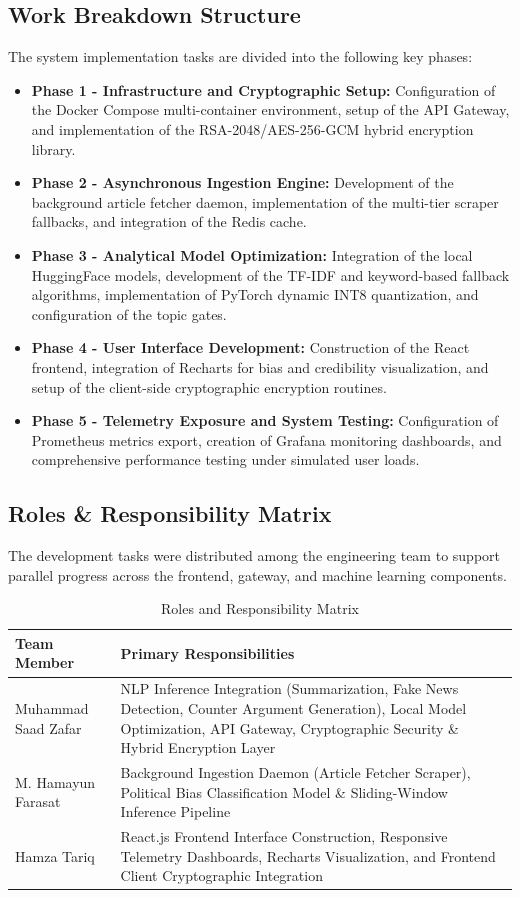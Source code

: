 \subsection{Work Breakdown Structure}
The system implementation tasks are divided into the following key phases:
\begin{itemize}
    \item \textbf{Phase 1 - Infrastructure and Cryptographic Setup:} Configuration of the Docker Compose multi-container environment, setup of the API Gateway, and implementation of the RSA-2048/AES-256-GCM hybrid encryption library.
    \item \textbf{Phase 2 - Asynchronous Ingestion Engine:} Development of the background article fetcher daemon, implementation of the multi-tier scraper fallbacks, and integration of the Redis cache.
    \item \textbf{Phase 3 - Analytical Model Optimization:} Integration of the local HuggingFace models, development of the TF-IDF and keyword-based fallback algorithms, implementation of PyTorch dynamic INT8 quantization, and configuration of the topic gates.
    \item \textbf{Phase 4 - User Interface Development:} Construction of the React frontend, integration of Recharts for bias and credibility visualization, and setup of the client-side cryptographic encryption routines.
    \item \textbf{Phase 5 - Telemetry Exposure and System Testing:} Configuration of Prometheus metrics export, creation of Grafana monitoring dashboards, and comprehensive performance testing under simulated user loads.
\end{itemize}

\subsection{Roles \& Responsibility Matrix}
The development tasks were distributed among the engineering team to support parallel progress across the frontend, gateway, and machine learning components.

\begin{table}[h]
\centering
\caption{Roles and Responsibility Matrix}
\label{tab:roles_matrix}
\renewcommand{\arraystretch}{1.2}
\begin{tabular}{|l|p{8.5cm}|}
\hline
\textbf{Team Member} & \textbf{Primary Responsibilities} \\ \hline
Muhammad Saad Zafar & NLP Inference Integration (Summarization, Fake News Detection, Counter Argument Generation), Local Model Optimization, API Gateway, Cryptographic Security \& Hybrid Encryption Layer \\ \hline
M. Hamayun Farasat & Background Ingestion Daemon (Article Fetcher Scraper), Political Bias Classification Model \& Sliding-Window Inference Pipeline \\ \hline
Hamza Tariq & React.js Frontend Interface Construction, Responsive Telemetry Dashboards, Recharts Visualization, and Frontend Client Cryptographic Integration \\ \hline
\end{tabular}
\end{table}

